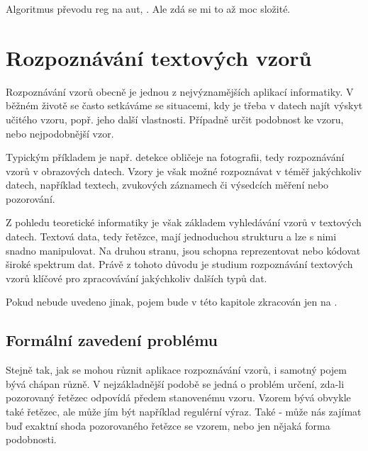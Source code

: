 \documentclass[a4paper,10pt]{article}
\begin{document}
Algoritmus převodu reg na aut, \cite{StaCir-ConsFuzzAutFuzzRegExp}. Ale zdá se mi to až moc složité.




\section{Rozpoznávání textových vzorů}

Rozpoznávání vzorů obecně je jednou z nejvýznamějších aplikací informatiky. V běžném životě se často setkáváme se situacemi, kdy je třeba v datech najít výskyt učitého vzoru, popř. jeho další vlastnosti. Případně určit podobnost ke vzoru, nebo nejpodobnější vzor.

Typickým příkladem je např. detekce obličeje na fotografii, tedy rozpoznávání vzorů v obrazových datech. Vzory je však možné rozpoznávat v téměř jakýchkoliv datech, například textech, zvukových záznamech či výsedcích měření nebo pozorování.

Z pohledu teoretické informatiky je však základem vyhledávání vzorů v textových datech. Textová data, tedy řetězce, mají jednoduchou strukturu a lze s nimi snadno manipulovat. Na druhou stranu, jsou schopna reprezentovat nebo kódovat široké spektrum dat. Právě z tohoto důvodu je studium rozpoznávání textových vzorů klíčové pro zpracovávání jakýchkoliv dalších typů dat.

\begin{note}
 Pokud nebude uvedeno jinak, pojem  bude v této kapitole zkracován jen na .
\end{note}

\subsection{Formální zavedení problému}
Stejně tak, jak se mohou různit aplikace rozpoznávání vzorů, i samotný pojem  bývá chápan různě. V nejzákladnější podobě se jedná o problém určení, zda-li pozorovaný řetězec odpovídá předem stanovenému vzoru. Vzorem bývá obvykle také řetězec, ale může jím být například regulérní výraz. Také - může nás zajímat buď exaktní shoda pozorovaného řetězce se vzorem, nebo jen nějaká forma podobnosti. 
\end{document}

